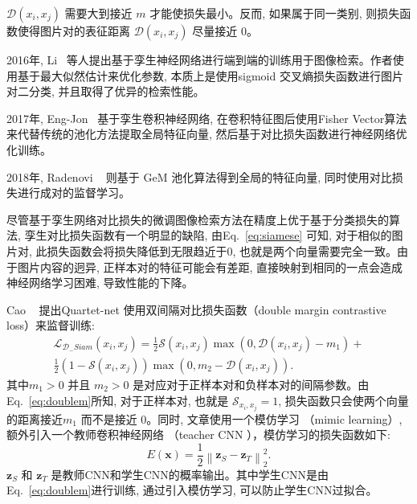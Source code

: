 $\mathcal{D}(x_i,x_j)$ 需要大到接近 $m$ 才能使损失最小。反而, 如果属于同一类别, 则损失函数使得图片对的表征距离 $\mathcal{D}(x_i, x_j)$ 尽量接近 0。\par
2016年, Li~\cite{li2015feature} 等人提出基于孪生神经网络进行端到端的训练用于图像检索。作者使用基于最大似然估计来优化参数, 本质上是使用sigmoid 交叉熵损失函数进行图片对二分类, 并且取得了优异的检索性能。 \par
2017年, Eng-Jon~\cite{Eng-Jon} 基于孪生卷积神经网络, 在卷积特征图后使用Fisher Vector算法来代替传统的池化方法提取全局特征向量, 然后基于对比损失函数进行神经网络优化训练。\par
2018年, Radenovi ~\cite{radenovic2018fine} 则基于 GeM 池化算法得到全局的特征向量, 同时使用对比损失进行成对的监督学习。 \par
尽管基于孪生网络对比损失的微调图像检索方法在精度上优于基于分类损失的算法, 孪生对比损失函数有一个明显的缺陷, 由Eq.~\ref{eq:siamese} 可知, 对于相似的图片对, 此损失函数会将损失降低到无限趋近于0, 也就是两个向量需要完全一致。由于图片内容的迥异, 正样本对的特征可能会有差距, 直接映射到相同的一点会造成神经网络学习困难, 导致性能的下降。 \par
Cao ~\cite{cao2016quartet} 提出Quartet-net 使用双间隔对比损失函数（double margin contrastive loss）来监督训练:
\begin{equation}
    \begin{array}{r}
        \mathcal{L}_{\mathcal{D}_{-} S i a m}\left(x_i, x_j\right)=\frac{1}{2} \mathcal{S}\left(x_i, x_j\right) \max \left(0, \mathcal{D}\left(x_i, x_j\right)-m_1\right)+ \\
        \frac{1}{2}\left(1-\mathcal{S}\left(x_i, x_j\right)\right) \max \left(0, m_2-\mathcal{D}\left(x_i, x_j\right)\right).
        \end{array}
        \label{eq:doublem}
\end{equation}
其中$m_1 > 0$ 并且 $m_2 > 0$ 是对应对于正样本对和负样本对的间隔参数。由 Eq.~\ref{eq:doublem}所知, 对于正样本对, 也就是 $\mathcal{S}_{x_i, x_j} = 1$, 损失函数只会使两个向量的距离接近$m_1$ 而不是接近 $0$。同时, 文章使用一个模仿学习 （mimic learning）, 额外引入一个教师卷积神经网络 （teacher CNN ），模仿学习的损失函数如下:
\begin{equation}
    E(\mathbf{x})=\frac{1}{2}\left\|\mathbf{z}_S-\mathbf{z}_T\right\|_2^2.
\end{equation}
$\mathbf{z}_S$ 和 $\mathbf{z}_{T}$ 是教师CNN和学生CNN的概率输出。其中学生CNN是由Eq.~\ref{eq:doublem}进行训练, 通过引入模仿学习, 可以防止学生CNN过拟合。 \par
